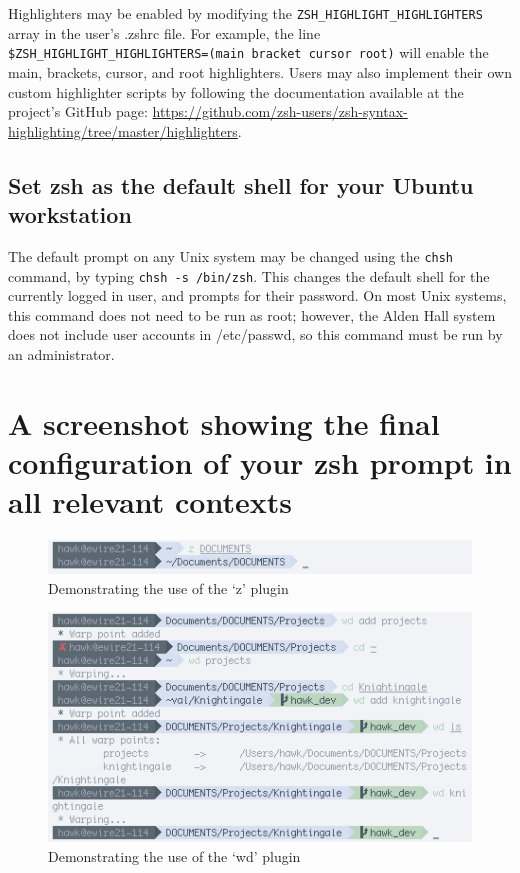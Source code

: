 \documentclass[12pt,a4paper]{article}
\begin{document}
				Highlighters may be enabled by modifying the \verb$ZSH_HIGHLIGHT_HIGHLIGHTERS$ array in the user's .zshrc file. For example, the line \lstinline{$ZSH_HIGHLIGHT_HIGHLIGHTERS=(main bracket cursor root)} will enable the main, brackets, cursor, and root highlighters. Users may also implement their own custom highlighter scripts by following the documentation available at the project's GitHub page: \url{https://github.com/zsh-users/zsh-syntax-highlighting/tree/master/highlighters}.
 
		\subsection{Set zsh as the default shell for your Ubuntu workstation}

			The default prompt on any Unix system may be changed using the \lstinline{chsh} command, by typing \lstinline{chsh -s /bin/zsh}. This changes the default shell for the currently logged in user, and prompts for their password. On most Unix systems, this command does not need to be run as root; however, the Alden Hall system does not include user accounts in /etc/passwd, so this command must be run by an administrator.

			\pagebreak
	\section{A screenshot showing the final configuration of your zsh prompt in all relevant contexts}
		\FloatBarrier
		\begin{figure}[!htb]
			\includegraphics[resolution=72, scale=0.75]{Lab1Images/demos/z.png}
			\caption{Demonstrating the use of the `z' plugin}
			\label{z}
		\end{figure}

		\begin{figure}[!!htb]
			\includegraphics[resolution=72, scale=0.75]{Lab1Images/demos/wd.png}
			\caption{Demonstrating the use of the `wd' plugin}
			\label{wd}
		\end{figure}
\end{document}

